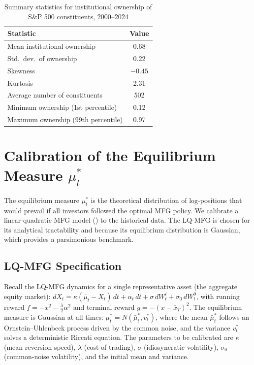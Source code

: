 \begin{table}[ht]
\centering
\caption{Summary statistics for institutional ownership of S\&P 500 constituents,
    2000--2024}
\label{tab:institutional-ownership-stats}
\begin{tabular}{lc}
\toprule
\textbf{Statistic} & \textbf{Value} \\
\midrule
Mean institutional ownership & 0.68 \\
Std.\ dev.\ of ownership & 0.22 \\
Skewness & $-0.45$ \\
Kurtosis & 2.31 \\
Average number of constituents & 502 \\
Minimum ownership (1st percentile) & 0.12 \\
Maximum ownership (99th percentile) & 0.97 \\
\bottomrule
\end{tabular}
\end{table}


\section{Calibration of the Equilibrium Measure $\mu_t^*$}
\label{sec:emp-calibration}

The equilibrium measure $\mu_t^*$ is the theoretical distribution of log-positions
that would prevail if all investors followed the optimal MFG policy. We calibrate a
linear-quadratic MFG model () to the historical data. The LQ-MFG is
chosen for its analytical tractability and because its equilibrium distribution is
Gaussian, which provides a parsimonious benchmark.

\subsection{LQ-MFG Specification}

Recall the LQ-MFG dynamics for a single representative asset (the aggregate equity
market): $dX_t = \kappa(\bar\mu_t - X_t)\, dt + \alpha_t\, dt + \sigma\, dW_t^i +
\sigma_0\, dW_t^0$, with running reward $f = -x^2 - \tfrac{\lambda}{2}\alpha^2$ and
terminal reward $g = -(x-\bar{x}_T)^2$. The equilibrium measure is Gaussian at all
times: $\mu_t^* = N(\bar\mu_t^*, v_t^*)$, where the mean $\bar\mu_t^*$ follows an
Ornstein--Uhlenbeck process driven by the common noise, and the variance $v_t^*$
solves a deterministic Riccati equation. The parameters to be calibrated are
$\kappa$ (mean-reversion speed), $\lambda$ (cost of trading), $\sigma$
(idiosyncratic volatility), $\sigma_0$ (common-noise volatility), and the initial
mean and variance.

